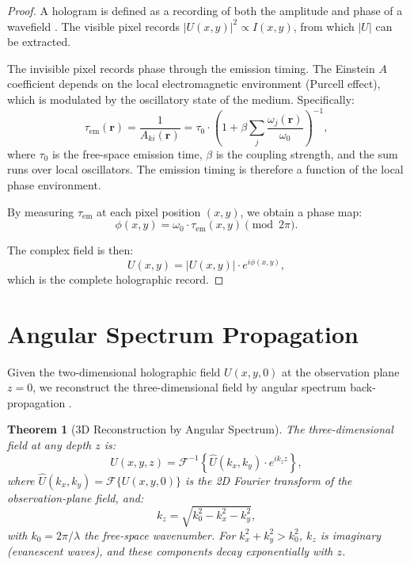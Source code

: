 \documentclass[11pt,twocolumn,a4paper]{article}
\newtheorem{theorem}{Theorem}[section]
\newcommand{\tauem}{\tau_{\mathrm{em}}}
\begin{document}
\begin{proof}
A hologram is defined as a recording of both the amplitude and phase
of a wavefield \citep{gabor1948,goodman2005}. The visible pixel
records $|U(x,y)|^2 \propto I(x,y)$, from which $|U|$ can be
extracted.

The invisible pixel records phase through the emission timing. The
Einstein $A$ coefficient depends on the local electromagnetic
environment (Purcell effect), which is modulated by the oscillatory
state of the medium. Specifically:
\begin{equation}
\tauem(\mathbf{r}) = \frac{1}{A_{ki}(\mathbf{r})}
  = \tau_0 \cdot \left(1 + \beta \sum_j
  \frac{\omega_j(\mathbf{r})}{\omega_0}\right)^{-1},
\label{eq:emission-timing}
\end{equation}
where $\tau_0$ is the free-space emission time, $\beta$ is the
coupling strength, and the sum runs over local oscillators. The
emission timing is therefore a function of the local phase environment.

By measuring $\tauem$ at each pixel position $(x,y)$, we obtain a
phase map:
\begin{equation}
\phi(x,y) = \omega_0 \cdot \tauem(x,y) \pmod{2\pi}.
\label{eq:phase-map}
\end{equation}

The complex field is then:
\begin{equation}
U(x,y) = |U(x,y)| \cdot e^{i\phi(x,y)},
\label{eq:complex-field}
\end{equation}
which is the complete holographic record.
\end{proof}


\section{Angular Spectrum Propagation}
\label{sec:angular-spectrum}

Given the two-dimensional holographic field $U(x,y,0)$ at the
observation plane $z=0$, we reconstruct the three-dimensional field by
angular spectrum back-propagation \citep{goodman2005,angularspectrum1968}.

\begin{theorem}[3D Reconstruction by Angular Spectrum]
\label{thm:angular-spectrum}
The three-dimensional field at any depth $z$ is:
\begin{equation}
U(x,y,z) = \mathcal{F}^{-1}\!\left\{
  \hat{U}(k_x, k_y) \cdot e^{ik_z z}
\right\},
\label{eq:angular-spectrum}
\end{equation}
where $\hat{U}(k_x, k_y) = \mathcal{F}\{U(x,y,0)\}$ is the 2D
Fourier transform of the observation-plane field, and:
\begin{equation}
k_z = \sqrt{k_0^2 - k_x^2 - k_y^2},
\label{eq:kz}
\end{equation}
with $k_0 = 2\pi/\lambda$ the free-space wavenumber. For
$k_x^2 + k_y^2 > k_0^2$, $k_z$ is imaginary (evanescent waves), and
these components decay exponentially with $z$.
\end{theorem}
\end{document}
